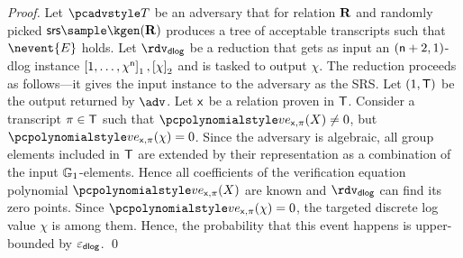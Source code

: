 \documentclass[runningheads,10pt]{llncs}
\begin{document}
\begin{proof}
   Let $\tdv$ be an adversary that for relation
  $\mathbf{R}$ and randomly picked $\srs \sample \kgen(\REL)$ produces a tree of
  acceptable transcripts such that $\nevent{E}$ holds. Let $\rdvdlog$ be a
  reduction that gets as input an $(\mathsf{n} + 2, 1)$-dlog instance
  $\left[1, \ldots, \chi^{\mathsf{n}}\right]_{1}, \left[\chi\right]_{2}$ and is tasked to output
  $\chi$. The reduction proceeds as follows---it gives the input instance to the
  adversary as the SRS. Let $(1, \mathsf{T})$ be the output returned by $\adv$. Let
  $\mathsf{x}$ be a relation proven in $\mathsf{T}$.  Consider a transcript
  $\pi \in \mathsf{T}$ such that $\vereq_{\inp, \zkproof}(X) \neq 0$, but
  $\vereq_{\inp, \zkproof}(\chi) = 0$. Since the adversary is algebraic, all group
  elements included in $\mathsf{T}$ are extended by their representation as a
  combination of the input $\mathbb{G}_1$-elements. Hence all coefficients of the
  verification equation polynomial $\vereq_{\inp, \zkproof}(X)$ are known and $\rdvdlog$
  can find its zero points. Since $\vereq_{\inp, \zkproof}(\chi) = 0$, the targeted
  discrete log value $\chi$ is among them.
  Hence, the probability that this event happens is upper-bounded by $\varepsilon_{\mathsf{dlog}}$. \qed
\end{proof}
\end{document}
